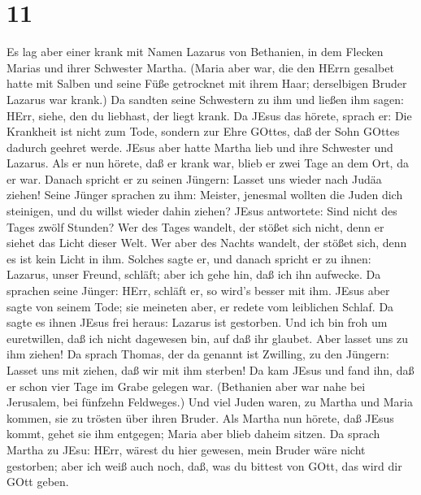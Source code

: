 \hypertarget{section-10}{%
\section{11}\label{section-10}}

 Es lag aber einer krank mit Namen Lazarus von Bethanien, in
dem Flecken Marias und ihrer Schwester Martha.  (Maria aber
war, die den HErrn gesalbet hatte mit Salben und seine Füße getrocknet
mit ihrem Haar; derselbigen Bruder Lazarus war krank.)  Da
sandten seine Schwestern zu ihm und ließen ihm sagen: HErr, siehe, den
du liebhast, der liegt krank.  Da JEsus das hörete, sprach
er: Die Krankheit ist nicht zum Tode, sondern zur Ehre GOttes, daß der
Sohn GOttes dadurch geehret werde.  JEsus aber hatte Martha
lieb und ihre Schwester und Lazarus.  Als er nun hörete, daß
er krank war, blieb er zwei Tage an dem Ort, da er war. 
Danach spricht er zu seinen Jüngern: Lasset uns wieder nach Judäa
ziehen!  Seine Jünger sprachen zu ihm: Meister, jenesmal
wollten die Juden dich steinigen, und du willst wieder dahin ziehen?
 JEsus antwortete: Sind nicht des Tages zwölf Stunden? Wer
des Tages wandelt, der stößet sich nicht, denn er siehet das Licht
dieser Welt.  Wer aber des Nachts wandelt, der stößet sich,
denn es ist kein Licht in ihm.  Solches sagte er, und
danach spricht er zu ihnen: Lazarus, unser Freund, schläft; aber ich
gehe hin, daß ich ihn aufwecke.  Da sprachen seine Jünger:
HErr, schläft er, so wird's besser mit ihm.  JEsus aber
sagte von seinem Tode; sie meineten aber, er redete vom leiblichen
Schlaf.  Da sagte es ihnen JEsus frei heraus: Lazarus ist
gestorben.  Und ich bin froh um euretwillen, daß ich nicht
dagewesen bin, auf daß ihr glaubet. Aber lasset uns zu ihm ziehen!
 Da sprach Thomas, der da genannt ist Zwilling, zu den
Jüngern: Lasset uns mit ziehen, daß wir mit ihm sterben! 
Da kam JEsus und fand ihn, daß er schon vier Tage im Grabe gelegen war.
 (Bethanien aber war nahe bei Jerusalem, bei fünfzehn
Feldweges.)  Und viel Juden waren, zu Martha und Maria
kommen, sie zu trösten über ihren Bruder.  Als Martha nun
hörete, daß JEsus kommt, gehet sie ihm entgegen; Maria aber blieb daheim
sitzen.  Da sprach Martha zu JEsu: HErr, wärest du hier
gewesen, mein Bruder wäre nicht gestorben;  aber ich weiß
auch noch, daß, was du bittest von GOtt, das wird dir GOtt geben.
